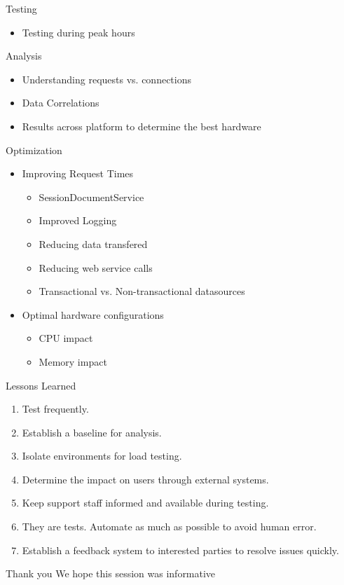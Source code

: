 \documentclass[xcolor=dvipsnames,14pt]{beamer}
\begin{document}
\begin{frame}{Testing}
  \begin{itemize}
    \item Testing during peak hours
  \end{itemize}
\end{frame}

\begin{frame}{Analysis}
  \begin{itemize}
    \item Understanding requests vs. connections
    \item Data Correlations
    \item Results across platform to determine the best hardware
  \end{itemize}
\end{frame}

\begin{frame}{Optimization}
  \begin{itemize}
    \item Improving Request Times
      \begin{itemize}
        \item SessionDocumentService
        \item Improved Logging
        \item Reducing data transfered
        \item Reducing web service calls
        \item Transactional vs. Non-transactional datasources
      \end{itemize}
    \item Optimal hardware configurations
      \begin{itemize}
        \item CPU impact
        \item Memory impact
      \end{itemize}
  \end{itemize}
\end{frame}

\begin{frame}{Lessons Learned}
  \begin{enumerate}
    \item Test frequently.
    \item Establish a baseline for analysis.
    \item Isolate environments for load testing.
    \item Determine the impact on users through external systems.
    \item Keep support staff informed and available during testing.
    \item They are tests. Automate as much as possible to avoid human error.
    \item Establish a feedback system to interested parties to resolve issues quickly.
  \end{enumerate}
\end{frame}

\begin{frame}{Thank you}
  We hope this session was informative
\end{frame}
\end{document}
